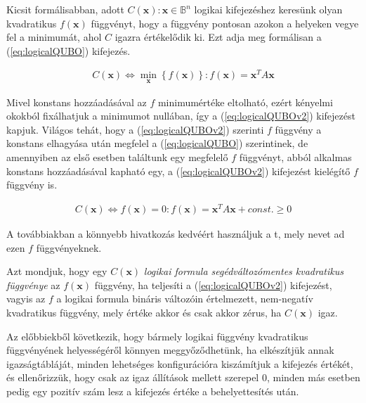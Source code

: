 Kicsit formálisabban, adott $C(\mathbf{x}) : \mathbf{x} \in \mathbb{B}^n$ logikai kifejezéshez keresünk olyan kvadratikus $f(\mathbf{x})$ függvényt, hogy a függvény pontosan azokon a helyeken vegye fel a minimumát, ahol $C$ igazra értékelődik ki. Ezt adja meg formálisan a (\ref{eq:logicalQUBO}) kifejezés.

\begin{align} \label{eq:logicalQUBO}
	C(\mathbf{x}) \Leftrightarrow  \min_{\mathbf{x}} \left\{ f(\mathbf{x}) \right\}
	: f(\mathbf{x})=\mathbf{x}^T A \mathbf{x}
\end{align}

Mivel konstans hozzáadásával az $f$ minimumértéke eltolható, ezért kényelmi okokból fixálhatjuk a minimumot nullában, így  a (\ref{eq:logicalQUBOv2}) kifejezést kapjuk. Világos tehát, hogy a (\ref{eq:logicalQUBOv2}) szerinti $f$ függvény a konstans elhagyása után megfelel a (\ref{eq:logicalQUBO}) szerintinek, de amennyiben az első esetben találtunk egy megfelelő $f$ függvényt, abból alkalmas konstans hozzáadásával kapható egy, a (\ref{eq:logicalQUBOv2}) kifejezést kielégítő $f$ függvény is.

\begin{align} \label{eq:logicalQUBOv2}
	C(\mathbf{x}) \Leftrightarrow  f(\mathbf{x})=0 
	: f(\mathbf{x})=\mathbf{x}^T A \mathbf{x} + const. \geq 0
\end{align}

A továbbiakban a könnyebb hivatkozás kedvéért használjuk a t, mely nevet ad ezen $f$ függvényeknek.

\begin{definition}\label{def:kvadFunc}
	Azt mondjuk, hogy egy $C(\mathbf{x})$ \textit{logikai formula segédváltozómentes kvadratikus függvénye} az $f(\mathbf{x})$ függvény, ha teljesíti a (\ref{eq:logicalQUBOv2}) kifejezést, vagyis az $f$ a logikai formula bináris változóin értelmezett, nem-negatív kvadratikus függvény, mely értéke akkor és csak akkor zérus, ha $C(\mathbf{x})$ igaz.	
\end{definition}

Az előbbiekből következik, hogy bármely logikai függvény kvadratikus függvényének helyességéről könnyen meggyőződhetünk, ha elkészítjük annak igazságtábláját, minden lehetséges konfigurációra kiszámítjuk a kifejezés értékét, és ellenőrizzük, hogy csak az igaz állítások mellett szerepel 0, minden más esetben pedig egy pozitív szám lesz a kifejezés értéke a behelyettesítés után.

